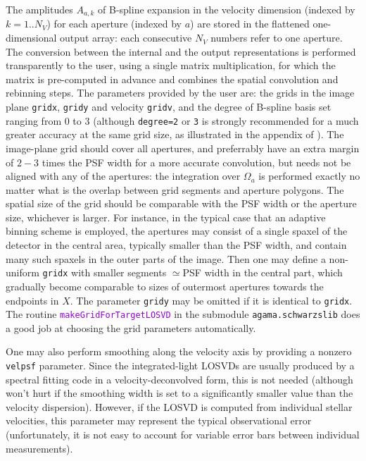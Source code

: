 \documentclass[12pt]{article}
\newcommand{\ttt}[1]{\textcolor{darkviolet}{\texttt{#1}}}
\newcommand{\ppp}[1]{\textcolor{darkolive} {\texttt{#1}}}
\begin{document}
The amplitudes $A_{a,k}$ of B-spline expansion in the velocity dimension (indexed by $k=1..N_V$) for each aperture (indexed by $a$) are stored in the flattened one-dimensional output array: each consecutive $N_V$ numbers refer to one aperture. The conversion between the internal and the output representations is performed transparently to the user, using a single matrix multiplication, for which the matrix is pre-computed in advance and combines the spatial convolution and rebinning steps. The parameters provided by the user are: the grids in the image plane \ppp{gridx}, \ppp{gridy} and velocity \ppp{gridv}, and the degree of B-spline basis set ranging from 0 to 3 (although \ppp{degree=2} or \ppp{3} is strongly recommended for a much greater accuracy at the same grid size, as illustrated in the appendix of \cite{VasilievValluri2020}). The image-plane grid should cover all apertures, and preferrably have an extra margin of $2-3$ times the PSF width for a more accurate convolution, but needs not be aligned with any of the apertures: the integration over $\Omega_a$ is performed exactly no matter what is the overlap between grid segments and aperture polygons. The spatial size of the grid should be comparable with the PSF width or the aperture size, whichever is larger. For instance, in the typical case that an adaptive binning scheme is employed, the apertures may consist of a single spaxel of the detector in the central area, typically smaller than the PSF width, and contain many such spaxels in the outer parts of the image. Then one may define a non-uniform \ppp{gridx} with smaller segments $\simeq$PSF width in the central part, which gradually become comparable to sizes of outermost apertures towards the endpoints in $X$. The parameter \ppp{gridy} may be omitted if it is identical to \ppp{gridx}. The routine \ttt{makeGridForTargetLOSVD} in the submodule \texttt{agama.schwarzslib} does a good job at choosing the grid parameters automatically.

One may also perform smoothing along the velocity axis by providing a nonzero \ppp{velpsf} parameter. Since the integrated-light LOSVDs  are usually produced by a spectral fitting code in a velocity-deconvolved form, this is not needed (although won't hurt if the smoothing width is set to a significantly smaller value than the velocity dispersion). However, if the LOSVD is computed from individual stellar velocities, this parameter may represent the typical observational error (unfortunately, it is not easy to account for variable error bars between individual measurements).
\end{document}
